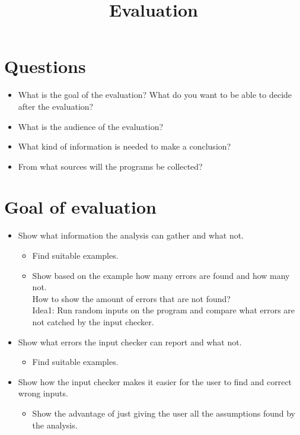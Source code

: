 \documentclass[11pt]{article}
\begin{document}
\title{Evaluation}

\maketitle


\section{Questions}


\begin{itemize}
  \item What is the goal of the evaluation? What do you want to be able to decide after the evaluation?
  \item What is the audience of the evaluation?
  \item What kind of information is needed to make a conclusion?
  \item From what sources will the programs be collected?
\end{itemize}

\section{Goal of evaluation}

\begin{itemize}
  \item Show what information the analysis can gather and what not.
  \begin{itemize}
    \item Find suitable examples.
    \item Show based on the example how many errors are found and how many not.\\
    How to show the amount of errors that are not found?\\
    Idea1: Run random inputs on the program and compare what errors are not catched by the input checker.
  \end{itemize}
  \item Show what errors the input checker can report and what not.
  \begin{itemize}
    \item Find suitable examples.
  \end{itemize}
  \item Show how the input checker makes it easier for the user to find and correct wrong inputs.
  \begin{itemize}
    \item Show the advantage of just giving the user all the assumptions found by the analysis.
  \end{itemize}
\end{itemize}
\end{document}
